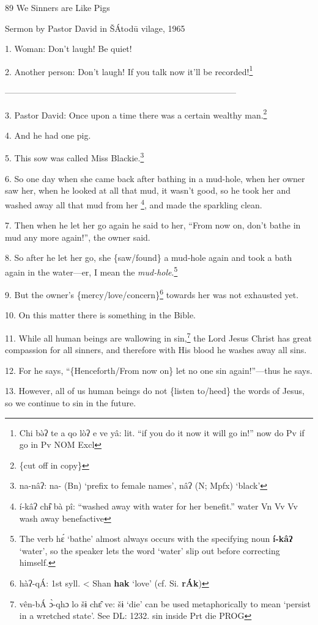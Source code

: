 
89 We Sinners are Like Pigs

Sermon by Pastor David in ŠÁtodū vilage, 1965

1. Woman: Don't laugh! Be quiet!

2. Another person: Don't laugh! If you talk now it'll be recorded!\footnote{Chi bə̀ʔ te a qo lòʔ e ve yâ: lit. ``if you do it now it will go in!''   now    do Pv if go in Pv NOM Excl}

---------------------------------------------------------------------------------

3. Pastor David: Once upon a time there was a certain wealthy man.\footnote{\{cut off in copy\}}

4. And he had one pig.

5. This sow was called Miss Blackie.\footnote{na-nâʔ: na- (Bn) `prefix to female names', nâʔ (N; Mpfx) `black'}

6. So one day when she came back after bathing in a mud-hole, when her owner saw
her, when he looked at all that mud, it wasn't good, so he took her and washed
away all that mud from her \footnote{í-kâʔ chɨ̂ bà pî: ``washed away with water for her benefit.''  water Vn Vv Vv  wash away benefactive}, and made the sparkling clean.

7. Then when he let her go again he said to her, ``From now on, don't bathe in
mud any more again!'', the owner said.

8. So after he let her go, she \{saw/found\} a mud-hole again and took a bath again
in the water---er, I mean the \textit{mud-hole}.\footnote{The verb hɛ́ `bathe' almost always occurs with the specifying noun \textbf{í-kâʔ} `water', so the speaker lets the word `water' slip out before correcting himself.}

9. But the owner's \{mercy/love/concern\}\footnote{hàʔ-qÁ: 1st syll. < Shan \textbf{hak} `love' (cf. Si. \textbf{rÁk})} towards her was not exhausted yet.

10. On this matter there is something in the Bible.

11. While all human beings are wallowing in sin,\footnote{vên-bÁ ɔ̀-qhɔ lo šɨ chɛ̂ ve: šɨ `die' can be used metaphorically to mean `persist in a wretched state'. See DL: 1232.  sin      inside Prt die PROG} the Lord Jesus Christ has great
compassion for all sinners, and therefore with His blood he washes away all sins.

12. For he says, ``\{Henceforth/From now on\} let no one sin again!''---thus he
says.

13. However, all of us human beings do not \{listen to/heed\} the words of Jesus,
so we continue to sin in the future.


